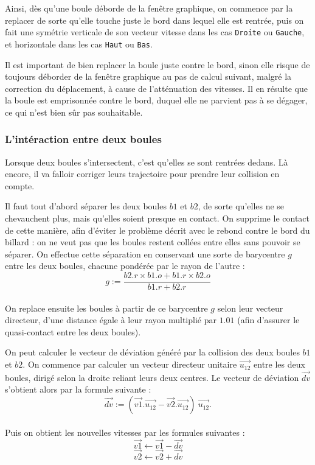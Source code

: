 \documentclass[a4paper,11pt]{article}
\begin{document}
Ainsi, dès qu'une boule déborde de la fenêtre graphique, on commence par la replacer de sorte qu'elle
touche juste le bord dans lequel elle est rentrée, puis on fait une symétrie verticale de son vecteur
vitesse dans les cas \texttt{Droite} ou \texttt{Gauche}, et horizontale dans les cas \texttt{Haut} ou \texttt{Bas}.

Il est important de bien replacer la boule juste contre le bord, sinon elle risque de toujours déborder
de la fenêtre graphique au pas de calcul suivant, malgré la correction du déplacement, à cause de l'atténuation
des vitesses. Il en résulte que la boule est emprisonnée contre le bord, duquel elle ne parvient pas à
se dégager, ce qui n'est bien sûr pas souhaitable.

\subsubsection{L'intéraction entre deux boules}
Lorsque deux boules s'intersectent, c'est qu'elles se sont rentrées dedans. Là encore, il va falloir
corriger leurs trajectoire pour prendre leur collision en compte.

Il faut tout d'abord séparer les deux boules $b1$ et $b2$, de sorte qu'elles ne se chevauchent plus, mais qu'elles
soient presque en contact. On supprime le contact de cette manière, afin d'éviter le problème décrit
avec le rebond contre le bord du billard : on ne veut pas que les boules restent collées entre elles
sans pouvoir se séparer. On effectue cette séparation en conservant une sorte de barycentre $g$ entre les
deux boules, chacune pondérée par le rayon de l'autre :
\[g := \frac{b2.r \times b1.o + b1.r \times b2.o}{b1.r + b2.r} \]
\\On replace ensuite les boules à partir de ce barycentre $g$ selon leur vecteur directeur, d'une distance
égale à leur rayon multiplié par $1.01$ (afin d'assurer le quasi-contact entre les deux boules).

On peut calculer le vecteur de déviation généré par la collision des deux boules $b1$ et $b2$. On commence
par calculer un vecteur directeur unitaire $\vec{u_{12}}$ entre les deux boules, dirigé selon la droite
reliant leurs deux centres. Le vecteur de déviation $\vec{dv}$ s'obtient alors par la formule suivante :
\[\vec{dv} := (\vec{v1} . \vec{u_{12}} - \vec{v2} . \vec{u_{12}}) \ \vec{u_{12}}. \]
\\Puis on obtient les nouvelles vitesses par les formules suivantes :
\[\vec{v1} \leftarrow \vec{v1} - \vec{dv}\]
\[\vec{v2} \leftarrow \vec{v2} + \vec{dv}\]
\end{document}
